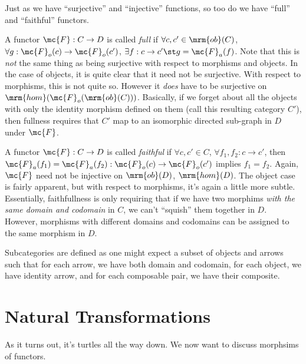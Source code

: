 \documentclass[nocover]{pset}
\newcommand{\ob}{\mrm{ob}}
\newcommand{\homm}{\mrm{hom}}
\begin{document}
Just as we have ``surjective'' and ``injective'' functions, so too do
we have ``full'' and ``faithful'' functors.\\

\begin{definition}
  A functor $\mc{F} : C \to D$ is called \emph{full} if $\forall c,c'
  \in \ob(C)$, $\forall g : \mc{F}_o(c) \to \mc{F}_o(c')$, $\exists f
  : c \to c' \st g = \mc{F}_a(f)$. Note that this is \emph{not} the
  same thing as being surjective with respect to morphisms and
  objects. In the case of objects, it is quite clear that it need not
  be surjective. With respect to morphisms, this is not quite so.
  However it \emph{does} have to be surjective on
  $\homm(\mc{F}_o(\ob(C)))$. Basically, if we forget about all the
  objects with only the identity morphism defined on them (call this
  resulting category $C'$), then fullness requires that $C'$ map to an
  isomorphic directed sub-graph in $D$ under $\mc{F}$.\\
\end{definition}

\begin{definition}
  A functor $\mc{F} : C \to D$ is called \emph{faithful} if $\forall
  c, c' \in C$, $\forall f_1, f_2 : c \to c'$, then $\mc{F}_a(f_1) =
  \mc{F}_a(f_2) : \mc{F}_o(c) \to \mc{F}_o(c')$ implies $f_1 = f_2$.
  Again, $\mc{F}$ need not be injective on $\ob(D)$, $\homm(D)$. The
  object case is fairly apparent, but with respect to morphisms, it's
  again a little more subtle. Essentially, faithfullness is only
  requiring that if we have two morphims \emph{with the same domain
    and codomain} in $C$, we can't ``squish'' them together in $D$.
  However, morphisms with different domains and codomains can be
  assigned to the same morphism in $D$.
\end{definition}

\begin{definition}
  Subcategories are defined as one might expect a subset of objects
  and arrows such that for each arrow, we have both domain and
  codomain, for each object, we have identity arrow, and for each
  composable pair, we have their composite.
\end{definition}

\section*{Natural Transformations}
As it turns out, it's turtles all the way down. We now want to discuss
morphsims of functors.
\end{document}
